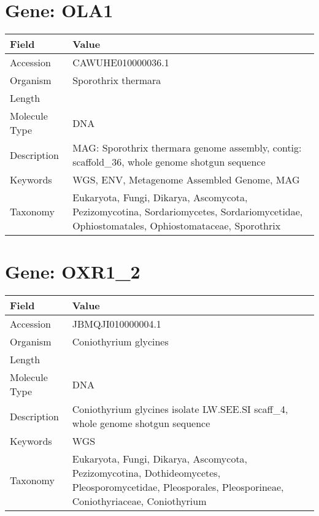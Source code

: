 \documentclass[10pt]{article}
\begin{document}
\section*{Gene: OLA1}
{\footnotesize
\begin{longtable}{>{\raggedright\arraybackslash}p{4.5cm} >{\raggedright\arraybackslash}p{11.5cm}}
\textbf{Field} & \textbf{Value} \\
\hline
Accession & CAWUHE010000036.1 \\
Organism & Sporothrix thermara \\
Length & 285080 \\
Molecule Type & DNA \\
Description & MAG: Sporothrix thermara genome assembly, contig: scaffold\_36, whole genome shotgun sequence \\
Keywords & WGS, ENV, Metagenome Assembled Genome, MAG \\
Taxonomy & Eukaryota, Fungi, Dikarya, Ascomycota, Pezizomycotina, Sordariomycetes, Sordariomycetidae, Ophiostomatales, Ophiostomataceae, Sporothrix \\
\end{longtable}
}


\section*{Gene: OXR1\_2}
{\footnotesize
\begin{longtable}{>{\raggedright\arraybackslash}p{4.5cm} >{\raggedright\arraybackslash}p{11.5cm}}
\textbf{Field} & \textbf{Value} \\
\hline
Accession & JBMQJI010000004.1 \\
Organism & Coniothyrium glycines \\
Length & 713357 \\
Molecule Type & DNA \\
Description & Coniothyrium glycines isolate LW.SEE.SI scaff\_4, whole genome shotgun sequence \\
Keywords & WGS \\
Taxonomy & Eukaryota, Fungi, Dikarya, Ascomycota, Pezizomycotina, Dothideomycetes, Pleosporomycetidae, Pleosporales, Pleosporineae, Coniothyriaceae, Coniothyrium \\
\end{longtable}
}
\end{document}
